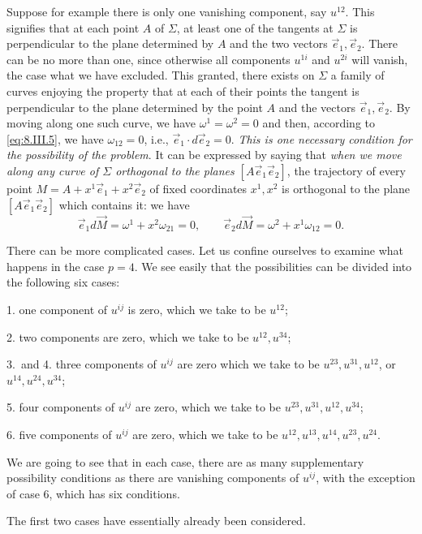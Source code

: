 \documentclass[leqno,11pt]{book}
\numberwithin{equation}{chapter}
\theoremstyle{shape1}
\theoremstyle{shape0}
\theoremstyle{shape2}
\theoremstyle{definition}
\begin{document}
Suppose for example there is only one vanishing component, say $u^{12}$. This signifies that at each point $A$ of $\Sigma$, at least one of the tangents at $\Sigma$ is perpendicular to the plane determined by $A$ and the two vectors $\vec e_{1}, \vec e_{2}$. There can be no more than one, since otherwise all components $u^{1i}$ and $u^{2i}$ will vanish, the case what we have excluded. This granted, there exists on $\Sigma$ a family of curves enjoying the property that at each of their points the tangent is perpendicular to the plane determined by the point $A$ and the vectors $\vec e_{1},\vec e_{2}$. By moving along one such curve, we have $\omega^{1}=\omega^{2}=0$ and then, according to \eqref{eq:8.III.5}, we have $\omega_{12}=0$, i.e., $\vec e_{1}\cdot d\vec e_{2}=0$. \emph{This is one necessary condition for the possibility of the problem}. It can be expressed by saying that \emph{when we move along any curve of $\Sigma$ orthogonal to the planes $[A\vec e_{1}\vec e_{2}]$}, the trajectory of every point $M=A+x^{1}\vec e_{1}+x^{2}\vec e_{2}$ of fixed coordinates $x^{1},x^{2}$ is orthogonal to the plane $[A\vec e_{1}\vec e_{2}]$ which contains it: we have
\[
\vec e_{1}d\vec M=\omega^{1}+x^{2}\omega_{21}=0,\qquad \vec e_{2}d\vec M=\omega^{2}+x^{1}\omega_{12}=0.
\]

\vspace{12pt}\fsec There can be more complicated cases. Let us confine ourselves to examine what happens in the case $p=4$. We see easily that the possibilities can be divided into the following six cases:

1. one component of $u^{ij}$ is zero, which we take to be $u^{12}$;

2. two components are zero, which we take to be $u^{12},u^{34}$;

3.~and 4. three components of $u^{ij}$ are zero which we take to be $u^{23},u^{31},u^{12}$, or $u^{14},u^{24},u^{34}$;

5. four components of $u^{ij}$ are zero, which we take to be $u^{23},u^{31},u^{12},u^{34}$;

6. five components of $u^{ij}$ are zero, which we take to be $u^{12},u^{13},u^{14},u^{23},u^{24}$.

We are going to see that in each case, there are as many supplementary possibility conditions as there are vanishing components of $u^{ij}$, with the exception of case 6, which has six conditions.

The first two cases have essentially already been considered.
\end{document}
